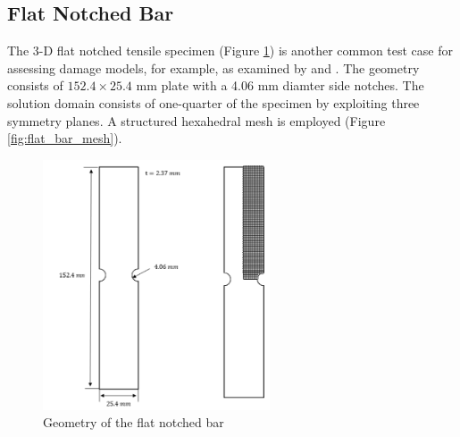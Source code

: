 \documentclass[sn-mathphys,Numbered,draft]{sn-jnl}%
\begin{document}
\subsection{Flat Notched Bar}
The 3-D flat notched tensile specimen (Figure \ref{fig:flat_bar_geom}) is another common test case for assessing damage models, for example, as examined by \citet{borden_phase-field_2016} and \citet{eldahshan_phase_2021}.
The geometry consists of $152.4 \times 25.4$ \si{\milli\meter} plate with a 4.06 \si{\milli\meter} diamter side notches.
The solution domain consists of one-quarter of the specimen by exploiting three symmetry planes.
A structured hexahedral mesh is employed (Figure \ref{fig:flat_bar_mesh}).

\begin{figure}[htb] \label{fig:flat_bar_geom}
\begin{center}
	\includegraphics[width=0.6\textwidth]{./Figures/finiteVolumeImplementation/inhomogenousDeformation/flatNotchedTensile.png}
\caption{Geometry of the flat notched bar}
\end{center}
\end{figure}
\end{document}
